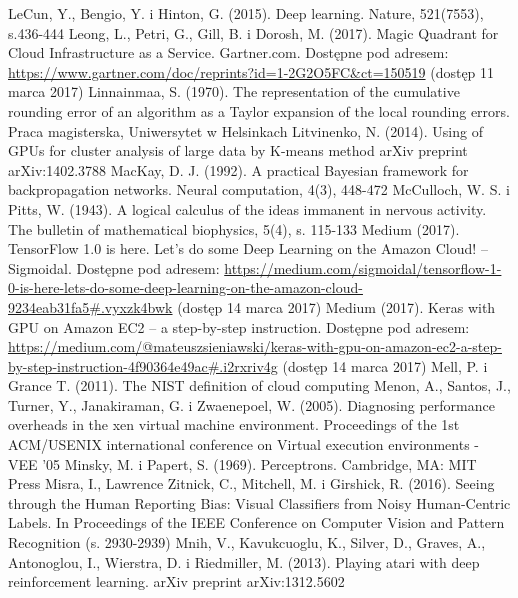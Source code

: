 \documentclass[12pt,a4paper,twoside]{article}
\begin{document}
\begin{thebibliography}{99}
 LeCun, Y., Bengio, Y. i Hinton, G. (2015). Deep learning. Nature, 521(7553), s.436-444
 Leong, L., Petri, G., Gill, B. i Dorosh, M. (2017). Magic Quadrant for Cloud Infrastructure as a Service. Gartner.com. Dostępne pod adresem: \url{https://www.gartner.com/doc/reprints?id=1-2G2O5FC&ct=150519} (dostęp 11 marca 2017)
 Linnainmaa, S. (1970). The representation of the cumulative rounding error of an algorithm as a
Taylor expansion of the local rounding errors. Praca magisterska, Uniwersytet w Helsinkach
 Litvinenko, N. (2014). Using of GPUs for cluster analysis of large data by K-means method arXiv preprint arXiv:1402.3788
 MacKay, D. J. (1992). A practical Bayesian framework for backpropagation networks. Neural computation, 4(3), 448-472
 McCulloch, W. S. i Pitts, W. (1943). A logical calculus of the ideas immanent in nervous activity. The bulletin of mathematical biophysics, 5(4), s. 115-133
 Medium (2017). TensorFlow 1.0 is here. Let’s do some Deep Learning on the Amazon Cloud! – Sigmoidal. Dostępne pod adresem: \url{https://medium.com/sigmoidal/tensorflow-1-0-is-here-lets-do-some-deep-learning-on-the-amazon-cloud-9234eab31fa5#.vyxzk4bwk} (dostęp 14 marca 2017)
 Medium (2017). Keras with GPU on Amazon EC2 – a step-by-step instruction. Dostępne pod adresem: \url{https://medium.com/@mateuszsieniawski/keras-with-gpu-on-amazon-ec2-a-step-by-step-instruction-4f90364e49ac#.i2rxriv4g} (dostęp 14 marca 2017)
 Mell, P. i Grance T. (2011). The NIST definition of cloud computing
 Menon, A., Santos, J., Turner, Y., Janakiraman, G. i Zwaenepoel, W. (2005). Diagnosing performance overheads in the xen virtual machine environment. Proceedings of the 1st ACM/USENIX international conference on Virtual execution environments - VEE '05
 Minsky, M. i Papert, S. (1969). Perceptrons. Cambridge, MA: MIT Press
 Misra, I., Lawrence Zitnick, C., Mitchell, M. i Girshick, R. (2016). Seeing through the Human Reporting Bias: Visual Classifiers from Noisy Human-Centric Labels. In Proceedings of the IEEE Conference on Computer Vision and Pattern Recognition (s. 2930-2939)
 Mnih, V., Kavukcuoglu, K., Silver, D., Graves, A., Antonoglou, I., Wierstra, D. i Riedmiller, M. (2013). Playing atari with deep reinforcement learning. arXiv preprint arXiv:1312.5602

\end{thebibliography}
\end{document}

